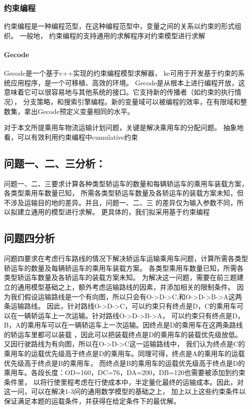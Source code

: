 \documentclass[UTF8]{ctexart}
\begin{document}
\subsubsection{约束编程}
约束编程是一种编程范型，在这种编程范型中，变量之间的关系以约束的形式组织。
一般地， 
约束编程的支持通用的求解程序对约束模型进行求解
\paragraph{Gecode}
Gecode\cite{gecode}是一个基于c++实现的约束编程模型求解器，
ke可用于开发基于约束的系统应用程序，是一个可移植、高效的环境。 Gecode是从根本上进行编程开放，这意味着它可以很容易地与其他系统的接口。它支持新的传播者（如约束的执行情况），
分支策略，和搜索引擎编程。新的变量域可以被编程的效率，在有限域和整数集，拿出Gecode预定义变量相同的水平。

	



对于本文所提乘用车物流运输计划问题，关键是解决乘用车的分配问题。
抽象地看，可以有效利用约束编程中cumulative约束


\subsection{问题一、二、三分析：}
问题一、二、三要求计算各种类型轿运车的数量和每辆轿运车的乘用车装载方案，各类型乘用车数量已知，
所需各类型轿运车数量及各轿运车的装载方案未知，但不涉及运输目的地的差异。并且，问题一、二、三
的差异仅为输入参数不同，所以拟建立通用的模型进行求解。
更具体的，我们拟采用基于约束编程










\subsection{问题四分析}
问题四要求在考虑行车路线的情况下解决轿运车运输乘用车问题，计算所需各类型轿运车的数量及每辆轿运车的乘用车装载方案。
各类型乘用车数量已知，所需各类型轿运车数量及各轿运车的装载方案未知。
为解决这一问题，需要在前三题建立的通用模型基础之上，额外考虑运输路线的因素，并添加相关的限制条件。
因为我们假设运输路线是一个有向图，所以只会有O->D->C,和O->D->B->A这两条运输路线。
因此，针对路线O->D->C，可以约束只有终点是D，C的乘用车可以在一辆轿运车上一次运输。针对路线O->D->B->A，
可以约束只有终点是D，B，A的乘用车可以在一辆轿运车上一次运输。因终点是D的乘用车在这两条路线的轿运车里都可以装载
，因此可以把装载终点是D的乘用车的装载优先级放低。又因行驶路线为有向图，所以在O->D->C这一运输路线中，
我们认为终点是C的乘用车的运载优先级高于终点是D的乘用车。同理可得，终点是A的乘用车的运载优先级高于终点是B的乘用车，
而终点是B的乘用车的运载优先级高于终点是D的乘用车。各段长度：OD=160，DC=76，DA=200，DB=120也需要被添加到约束条件里，
以将行使里程考虑在行使成本中，半定量化最终的运输成本。因此，对这一问，可以在解决1-3问的通用数学模型的基础之上，
加上以上这些约束条件以保证满足本题的运载条件，并获得在给定条件下的最优解。
\end{document}
